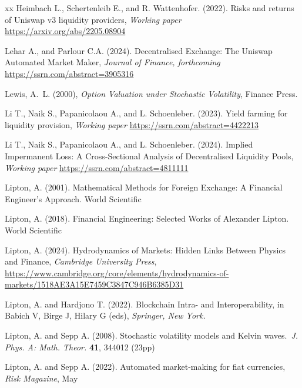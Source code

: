 \documentclass[pdftex,11pt,a4paper] {article}
\begin{document}
\begin{thebibliography}{xx}
 Heimbach L.,
Schertenleib E., and R. Wattenhofer. (2022). Risks and returns of Uniswap v3
liquidity providers, \emph{Working paper} %
\url{https://arxiv.org/abs/2205.08904}

 Lehar A., and
Parlour C.A. (2024). Decentralised Exchange: The Uniswap Automated Market
Maker, \emph{Journal of Finance, forthcoming} %
\url{https://ssrn.com/abstract=3905316}

 Lewis, A.~L. (2000), \emph{%
Option Valuation under Stochastic Volatility}, Finance Press.

 Li T., Naik S.,
Papanicolaou A., and L. Schoenleber. (2023). Yield farming for liquidity
provision, \emph{Working paper} \url{https://ssrn.com/abstract=4422213}

 Li T., Naik S.,
Papanicolaou A., and L. Schoenleber. (2024). Implied Impermanent Loss: A
Cross-Sectional Analysis of Decentralised Liquidity Pools, \emph{Working
paper} \url{https://ssrn.com/abstract=4811111}

 Lipton, A. (2001).
Mathematical Methods for Foreign Exchange: A Financial Engineer's Approach.
World Scientific

 Lipton, A. (2018).
Financial Engineering: Selected Works of Alexander Lipton.
World Scientific

 Lipton, A. (2024).
Hydrodynamics of Markets: Hidden Links Between Physics and Finance, \emph{%
Cambridge University Press}, \url{https://www.cambridge.org/core/elements/hydrodynamics-of-markets/1518AE3A15E7459C3847C946B6385D31}

 Lipton,
A. and Hardjono T. (2022). Blockchain Intra- and Interoperability, in Babich
V, Birge J, Hilary G (eds), \emph{Springer, New York.}

 Lipton, A. and
Sepp A. (2008). Stochastic volatility models and Kelvin waves.\emph{\ J. Phys. A: Math.
Theor.} \textbf{41}, 344012 (23pp)

 Lipton, A. and
Sepp A. (2022). Automated market-making for fiat currencies, \emph{Risk
Magazine}, May


\end{thebibliography}
\end{document}
